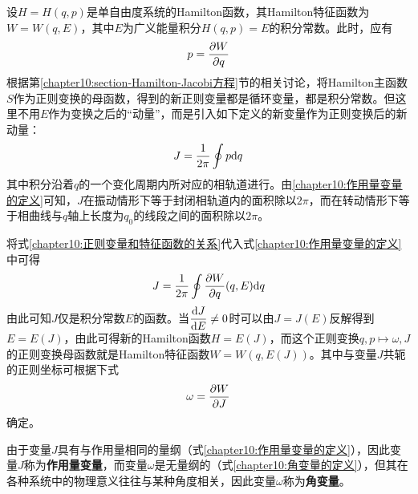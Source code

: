 设$H=H(q,p)$是单自由度系统的Hamilton函数，其Hamilton特征函数为$W=W(q,E)$，其中$E$为广义能量积分$H(q,p)=E$的积分常数。此时，应有
\begin{equation}
	p = \frac{\partial W}{\partial q}
	\label{chapter10:正则变量和特征函数的关系}
\end{equation}
根据第\ref{chapter10:section-Hamilton-Jacobi方程}节的相关讨论，将Hamilton主函数$S$作为正则变换的母函数，得到的新正则变量都是循环变量，都是积分常数。但这里不用$E$作为变换之后的“动量”，而是引入如下定义的新变量作为正则变换后的新动量：
\begin{equation}
	J = \frac{1}{2\pi}\oint p\mathrm{d} q
	\label{chapter10:作用量变量的定义}
\end{equation}
其中积分沿着$q$的一个变化周期内所对应的相轨道进行。由\eqref{chapter10:作用量变量的定义}可知，$J$在振动情形下等于封闭相轨道内的面积除以$2\pi$，而在转动情形下等于相曲线与$q$轴上长度为$q_0$的线段之间的面积除以$2\pi$。

将式\eqref{chapter10:正则变量和特征函数的关系}代入式\eqref{chapter10:作用量变量的定义}中可得
\begin{equation}
	J = \frac{1}{2\pi}\oint \frac{\partial W}{\partial q}(q,E)\mathrm{d} q
	\label{chapter10:作用量变量的定义-变形}
\end{equation}
由此可知$J$仅是积分常数$E$的函数。当$\dfrac{\mathrm{d} J}{\mathrm{d} E} \neq 0$时可以由$J=J(E)$反解得到$E=E(J)$，由此可得新的Hamilton函数$H = E(J)$，而这个正则变换$q,p \mapsto \omega, J$的正则变换母函数就是Hamilton特征函数$W=W(q,E(J))$。其中与变量$J$共轭的正则坐标可根据下式
\begin{equation}
	\omega = \frac{\partial W}{\partial J}
	\label{chapter10:角变量的定义}
\end{equation}
确定。

由于变量$J$具有与作用量相同的量纲（式\eqref{chapter10:作用量变量的定义}），因此变量$J$称为{\bf 作用量变量}，而变量$\omega$是无量纲的（式\eqref{chapter10:角变量的定义}），但其在各种系统中的物理意义往往与某种角度相关，因此变量$\omega$称为{\bf 角变量}。


